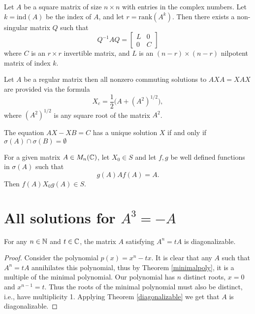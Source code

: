 \documentclass{article}
\begin{document}
\begin{theorem} \label{core-nilpotent}
Let $A$ be a square matrix of size $n \times n$ with entries in the complex numbers. Let $k = \mathrm{ind}(A)$ be the index of $A$, and let $r = \mathrm{rank}(A^k)$. Then there exists a non-singular matrix $Q$ such that
\[
Q^{-1}AQ = 
\begin{bmatrix}
    L & 0 \\
    0 & C
\end{bmatrix}
\]
where $C$ is an $r \times r$ invertible matrix, and $L$ is an $(n-r) \times (n-r)$ nilpotent matrix of index $k$.
\end{theorem}

\begin{theorem} \label{invertible}
  Let $A$ be a regular matrix then all nonzero commuting solutions to $A X A = X A X$ are provided via the formula
  \[X_c = \frac{1}{2} \bigl( A + (A^2)^{1/2} \bigl),\]
  where $(A^2)^{1/2}$ is any square root of the matrix $A^2$.
\end{theorem}

\begin{theorem} \label{Sylverster-equation}
  The equation $AX - XB = C$ has a unique solution $X$ if and only if $\sigma (A) \cap \sigma (B) = \emptyset$
\end{theorem}

\begin{theorem} \label{generating-solutions}
  For a given matrix $A \in M_n (\mathbb{C})$, let $X_0 \in S$ and let $f, g$ be well defined functions in $\sigma (A)$ such that
  \[g(A) A f(A) = A.\]
  Then $f(A) X_0 g(A) \in S$.
\end{theorem}

\section{All solutions for $A^3 = -A$}

\begin{theorem} \label{periodic-diagonal}
  For any $n \in \mathbb{N}$ and $t \in \mathbb{C}$, the matrix $A$ satisfying $A^n = t A$ is diagonalizable.
\end{theorem}

\begin{proof}
  Consider the polynomial $p(x) = x^n - t x$.
  It is clear that any $A$ such that $A^n = t A$ annihilates this polynomial, thus by Theorem \ref{minimalpoly}, it is a multiple of the minimal polynomial.
  Our polynomial has $n$ distinct roots, $x = 0$ and $x^{n - 1} = t$.
  Thus the roots of the minimal polynomial must also be distinct, i.e., have multiplicity 1.
  Applying Theorem \ref{diagonalizable} we get that $A$ is diagonalizable.
\end{proof}
\end{document}
